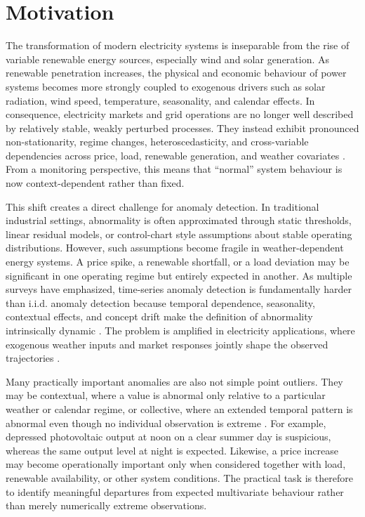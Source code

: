 \section{Motivation}

The transformation of modern electricity systems is inseparable from the rise of variable renewable energy sources, especially wind and solar generation. As renewable penetration increases, the physical and economic behaviour of power systems becomes more strongly coupled to exogenous drivers such as solar radiation, wind speed, temperature, seasonality, and calendar effects. In consequence, electricity markets and grid operations are no longer well described by relatively stable, weakly perturbed processes. They instead exhibit pronounced non-stationarity, regime changes, heteroscedasticity, and cross-variable dependencies across price, load, renewable generation, and weather covariates \cite{hong2016probabilistic,weron2014electricity}. From a monitoring perspective, this means that ``normal'' system behaviour is now context-dependent rather than fixed.

This shift creates a direct challenge for anomaly detection. In traditional industrial settings, abnormality is often approximated through static thresholds, linear residual models, or control-chart style assumptions about stable operating distributions. However, such assumptions become fragile in weather-dependent energy systems. A price spike, a renewable shortfall, or a load deviation may be significant in one operating regime but entirely expected in another. As multiple surveys have emphasized, time-series anomaly detection is fundamentally harder than i.i.d. anomaly detection because temporal dependence, seasonality, contextual effects, and concept drift make the definition of abnormality intrinsically dynamic \cite{chandola2009anomaly,blazquez2021review}. The problem is amplified in electricity applications, where exogenous weather inputs and market responses jointly shape the observed trajectories \cite{hong2016probabilistic,weron2014electricity}.


Many practically important anomalies are also not simple point outliers. They may
be contextual, where a value is abnormal only relative to a particular weather or
calendar regime, or collective, where an extended temporal pattern is abnormal
even though no individual observation is extreme
\cite{chandola2009anomaly,blazquez2021review}. For example, depressed photovoltaic
output at noon on a clear summer day is suspicious, whereas the same output level
at night is expected. Likewise, a price increase may become operationally important
only when considered together with load, renewable availability, or other system
conditions. The practical task is therefore to identify meaningful departures from
expected multivariate behaviour rather than merely numerically extreme observations.

